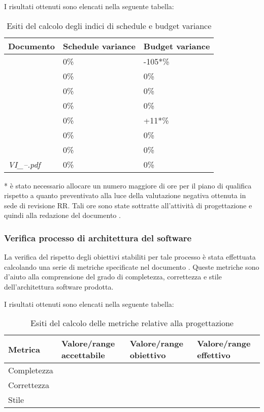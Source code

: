 		I risultati ottenuti sono elencati nella seguente tabella:	
		\begin{table}[H]
		\begin{tabular}{|l|l|l|}
		\hline
		\textbf{Documento} 		&\textbf{Schedule variance} &\textbf{Budget variance} 		\\
		\hline
		\PdQ 					&0\%		&-105*\%\\
		\NdP 					&0\%		&0\%\\
		\AdR 					&0\%		&0\%\\
		\PdP 					&0\%		&0\%\\
		\ST						&0\%		&+11*\%\\
		\DP						&0\%		&0\%\\
		\Glossario 				&0\%		&0\%\\
		\textit{VI_--.pdf} 		&0\%		&0\%\\
		\hline
		\end{tabular}
		\caption{Esiti del calcolo degli indici di schedule e budget variance}
		\end{table}
		* è stato necessario allocare un numero maggiore di ore per il piano di qualifica rispetto a quanto preventivato alla luce della valutazione negativa ottenuta in sede di revisione RR. Tali ore sono state sottratte all'attività di progettazione e quindi alla redazione del documento \ST.
		
		\subsubsection{Verifica processo di architettura del software}
		La verifica del rispetto degli obiettivi stabiliti per tale processo è stata effettuata calcolando una serie di metriche specificate nel documento \NdP. Queste metriche sono d'aiuto alla comprensione del grado di completezza, correttezza e stile dell'architettura software prodotta.
		
		I risultati ottenuti sono elencati nella seguente tabella:
		\begin{table}[H]
		\begin{tabular}{|l|p{2.25cm}|p{2.25cm}|p{2.25cm}|}
		\hline
		\textbf{Metrica} 		 					&\textbf{Valore/range accettabile}	&\textbf{Valore/range obiettivo}	&\textbf{Valore/range effettivo}\\
		\hline
		Completezza									&								&							&\\



		\hline
		Correttezza 								&								&							&\\



		\hline
		Stile 										&								&							&\\



		\hline
		\end{tabular}
		\caption{Esiti del calcolo delle metriche relative alla progettazione}
		\end{table}
		
